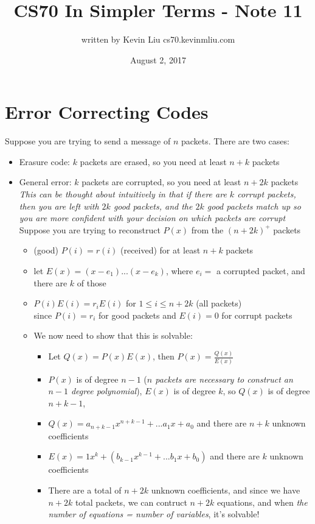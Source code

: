 \documentclass[a4paper]{article}
\title{CS70 In Simpler Terms - Note 11}
\author{written by Kevin Liu cs70.kevinmliu.com}
\date{August 2, 2017}
\begin{document}
\maketitle

\section{Error Correcting Codes}
Suppose you are trying to send a message of $n$ packets. There are two cases:
\begin{itemize}
    \item Erasure code: $k$ packets are erased, so you need at least $n+k$ packets 
    \item General error: $k$ packets are corrupted, so you need at least $n + 2k$ packets \\
    \textit{This can be thought about intuitively in that if there are $k$ corrupt packets, then you are left with $2k$ good packets, and the $2k$ good packets match up so you are more confident with your decision on which packets are corrupt}\\
    Suppose you are trying to reconstruct $P(x)$ from the $(n+2k)^+$ packets
    \begin{itemize}
        \item (good) $P(i) = r(i)$ (received) for at least $n+k$ packets
        \item let $E(x) = (x-e_1)...(x-e_k)$, where $e_i =$ a corrupted packet, and there are $k$ of those
        \item $P(i)E(i) = r_i E(i)$ for $1 \leq i \leq n+2k$ (all packets)\\
        since $P(i) = r_i$ for good packets and $E(i) = 0$ for corrupt packets
        \item We now need to show that this is solvable:
        \begin{itemize}
            \item Let $Q(x) = P(x)E(x)$, then $P(x) = \frac{Q(x)}{E(x)}$
            \item $P(x)$ is of degree $n-1$ (\textit{$n$ packets are necessary to construct an $n-1$ degree polynomial}), $E(x)$ is of degree $k$, so $Q(x)$ is of degree $n+k-1$, 
            \item $Q(x)= a_{n+k-1}x^{n+k-1} + ...a_1x + a_0$ and there are $n+k$ unknown coefficients
            \item $E(x) = 1x^k + (b_{k-1}x^{k-1} + ...b_1x + b_0)$ and there are $k$ unknown coefficients
            \item There are a total of $n+2k$ unknown coefficients, and since we have $n+2k$ total packets, we can contruct $n+2k$ equations, and when \textit{the number of equations = number of variables}, it's solvable!

\end{itemize}
\end{itemize}
\end{itemize}
\end{document}
